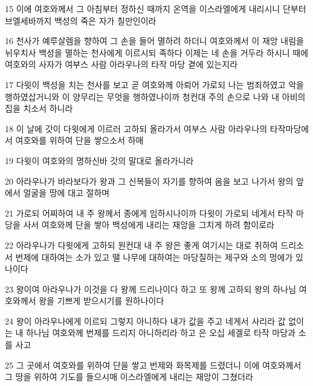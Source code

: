 \par 15 이에 여호와께서 그 아침부터 정하신 때까지 온역을 이스라엘에게 내리시니 단부터 브엘세바까지 백성의 죽은 자가 칠만인이라
\par 16 천사가 예루살렘을 향하여 그 손을 들어 멸하려 하더니 여호와께서 이 재앙 내림을 뉘우치사 백성을 멸하는 천사에게 이르시되 족하다 이제는 네 손을 거두라 하시니 때에 여호와의 사자가 여부스 사람 아라우나의 타작 마당 곁에 있는지라
\par 17 다윗이 백성을 치는 천사를 보고 곧 여호와께 아뢰어 가로되 나는 범죄하였고 악을 행하였삽거니와 이 양무리는 무엇을 행하였나이까 청컨대 주의 손으로 나와 내 아비의 집을 치소서 하니라
\par 18 이 날에 갓이 다윗에게 이르러 고하되 올라가서 여부스 사람 아라우나의 타작마당에서 여호와를 위하여 단을 쌓으소서 하매
\par 19 다윗이 여호와의 명하신바 갓의 말대로 올라가니라
\par 20 아라우나가 바라보다가 왕과 그 신복들이 자기를 향하여 옴을 보고 나가서 왕의 앞에서 얼굴을 땅에 대고 절하며
\par 21 가로되 어찌하여 내 주 왕께서 종에게 임하시나이까 다윗이 가로되 네게서 타작 마당을 사서 여호와께 단을 쌓아 백성에게 내리는 재앙을 그치게 하려 함이로라
\par 22 아라우나가 다윗에게 고하되 원컨대 내 주 왕은 좋게 여기시는 대로 취하여 드리소서 번제에 대하여는 소가 있고 땔 나무에 대하여는 마당질하는 제구와 소의 멍에가 있나이다
\par 23 왕이여 아라우나가 이것을 다 왕께 드리나이다 하고 또 왕께 고하되 왕의 하나님 여호와께서 왕을 기쁘게 받으시기를 원하나이다
\par 24 왕이 아라우나에게 이르되 그렇지 아니하다 내가 값을 주고 네게서 사리라 값 없이는 내 하나님 여호와께 번제를 드리지 아니하리라 하고 은 오십 세겔로 타작 마당과 소를 사고
\par 25 그 곳에서 여호와를 위하여 단을 쌓고 번제와 화목제를 드렸더니 이에 여호와께서 그 땅을 위하여 기도를 들으시매 이스라엘에게 내리는 재앙이 그쳤더라


